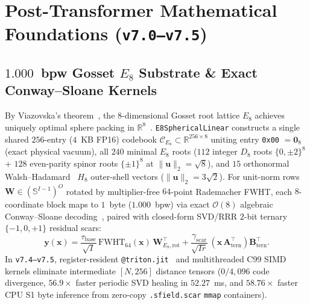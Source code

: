 \documentclass[10pt,twocolumn]{article}
\begin{document}
\section{Post-Transformer Mathematical Foundations (\texttt{v7.0--v7.5})}

\subsection{$1.000$~bpw Gosset $E_8$ Substrate \& Exact Conway--Sloane Kernels}
By Viazovska's theorem~\citep{viazovska2017sphere}, the $8$-dimensional Gosset root lattice $E_8$ achieves uniquely optimal sphere packing in $\mathbb{R}^8$~\citep{kabatiansky1978bounds}. \texttt{E8SphericalLinear} constructs a single shared $256$-entry ($4$~KB FP16) codebook $\mathcal{C}_{E_8} \subset \mathbb{R}^{256 \times 8}$ uniting entry \texttt{0x00} $=\mathbf{0}_8$ (exact physical vacuum), all $240$ minimal $E_8$ roots ($112$ integer $D_8$ roots $\{0,\pm 2\}^8$ + $128$ even-parity spinor roots $\{\pm 1\}^8$ at $\|\mathbf{u}\|_2 = \sqrt{8}$), and $15$ orthonormal Walsh--Hadamard~\citep{walsh1923closed} $H_8$ outer-shell vectors ($\|\mathbf{u}\|_2 = 3\sqrt{2}$). For unit-norm rows $\mathbf{W} \in (\mathbb{S}^{I-1})^O$ rotated by multiplier-free $64$-point Rademacher FWHT, each $8$-coordinate block maps to $1$~byte ($1.000$~bpw) via exact $\mathcal{O}(8)$ algebraic Conway--Sloane decoding~\citep{conway1982fast}, paired with closed-form SVD/RRR $2$-bit ternary $\{-1,0,+1\}$ residual scars:
\begin{equation}
    \mathbf{y}(\mathbf{x}) = \frac{\tau_{\text{base}}}{\sqrt{I}}\,\mathrm{FWHT}_{64}(\mathbf{x})\,\mathbf{W}_{E_8,\text{rot}}^\top + \frac{\gamma_{\text{scar}}}{\sqrt{I r}}\,(\mathbf{x}\,\mathbf{A}_{\text{tern}}^\top)\mathbf{B}_{\text{tern}}^\top.
    \label{eq:e8_ternary}
\end{equation}
In \texttt{v7.4--v7.5}, register-resident \texttt{@triton.jit}~\citep{tillet2019triton} and multithreaded C99 SIMD kernels eliminate intermediate $[N, 256]$ distance tensors ($0/4{,}096$ code divergence, $56.9\times$ faster periodic SVD healing in $52.27$~ms, and $58.76\times$ faster CPU S1 byte inference from zero-copy \texttt{.sfield.scar} \texttt{mmap} containers).
\end{document}
